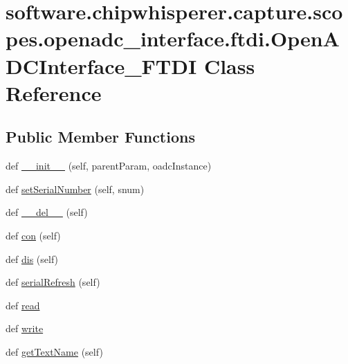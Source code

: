 \hypertarget{classsoftware_1_1chipwhisperer_1_1capture_1_1scopes_1_1openadc__interface_1_1ftdi_1_1OpenADCInterface__FTDI}{}\section{software.\+chipwhisperer.\+capture.\+scopes.\+openadc\+\_\+interface.\+ftdi.\+Open\+A\+D\+C\+Interface\+\_\+\+F\+T\+D\+I Class Reference}
\label{classsoftware_1_1chipwhisperer_1_1capture_1_1scopes_1_1openadc__interface_1_1ftdi_1_1OpenADCInterface__FTDI}
\subsection*{Public Member Functions}
\begin{DoxyCompactItemize}
\item 
def \hyperlink{classsoftware_1_1chipwhisperer_1_1capture_1_1scopes_1_1openadc__interface_1_1ftdi_1_1OpenADCInterface__FTDI_afb0cd44490c54c9b9b435f6ab77f55d0}{\+\_\+\+\_\+init\+\_\+\+\_\+} (self, parent\+Param, oadc\+Instance)
\item 
def \hyperlink{classsoftware_1_1chipwhisperer_1_1capture_1_1scopes_1_1openadc__interface_1_1ftdi_1_1OpenADCInterface__FTDI_a885932fe98bba835d65880d98e9b2ed5}{set\+Serial\+Number} (self, snum)
\item 
def \hyperlink{classsoftware_1_1chipwhisperer_1_1capture_1_1scopes_1_1openadc__interface_1_1ftdi_1_1OpenADCInterface__FTDI_a0833816773ba43fc4db40bb506ea1d9c}{\+\_\+\+\_\+del\+\_\+\+\_\+} (self)
\item 
def \hyperlink{classsoftware_1_1chipwhisperer_1_1capture_1_1scopes_1_1openadc__interface_1_1ftdi_1_1OpenADCInterface__FTDI_a486c1585a51cde123a725e86d67ef8d8}{con} (self)
\item 
def \hyperlink{classsoftware_1_1chipwhisperer_1_1capture_1_1scopes_1_1openadc__interface_1_1ftdi_1_1OpenADCInterface__FTDI_a4117555e7d0eaf07d6f4c33bcff47a69}{dis} (self)
\item 
def \hyperlink{classsoftware_1_1chipwhisperer_1_1capture_1_1scopes_1_1openadc__interface_1_1ftdi_1_1OpenADCInterface__FTDI_ada0445e7baf8b70666932773754b2289}{serial\+Refresh} (self)
\item 
def \hyperlink{classsoftware_1_1chipwhisperer_1_1capture_1_1scopes_1_1openadc__interface_1_1ftdi_1_1OpenADCInterface__FTDI_a7286ec14653220e6b076bd45f5ff0d51}{read}
\item 
def \hyperlink{classsoftware_1_1chipwhisperer_1_1capture_1_1scopes_1_1openadc__interface_1_1ftdi_1_1OpenADCInterface__FTDI_a305bbacd065df3b7f1b5f296be18122b}{write}
\item 
def \hyperlink{classsoftware_1_1chipwhisperer_1_1capture_1_1scopes_1_1openadc__interface_1_1ftdi_1_1OpenADCInterface__FTDI_a8331073501c771a46ab51992200d9589}{get\+Text\+Name} (self)
\end{DoxyCompactItemize}
